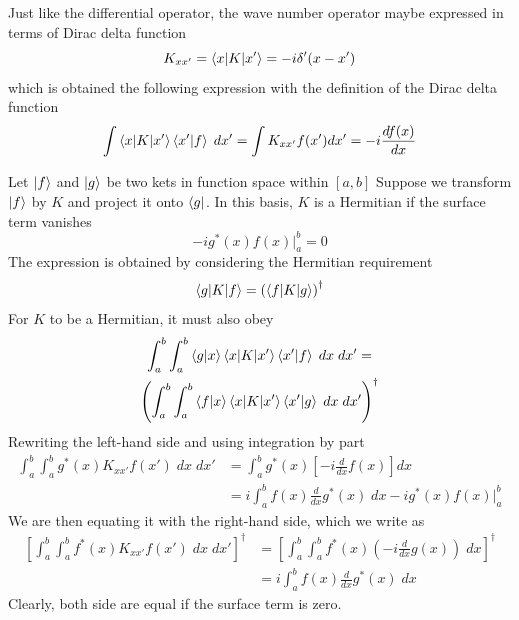 \documentclass[../../../main.tex]{subfiles}
\begin{document}
Just like the differential operator, the wave number operator maybe expressed in terms of Dirac delta function
\begin{equation*}
	K_{xx'}=\braket{x|K|x'}=-i\delta'(x-x')
\end{equation*}
which is obtained the following expression with the definition of the Dirac delta function
\begin{equation*}
	\int \braket{x|K|x'}\braket{x'|f}\;dx'=\int K_{xx'}f(x')dx'=-i\frac{df(x)}{dx}
\end{equation*}

Let $\ket{f}$ and $\ket{g}$ be two kets in function space within $[a,b]$
Suppose we transform $\ket{f}$ by $K$ and project it onto $\bra{g}$.
In this basis, $K$ is a Hermitian if the surface term vanishes
\begin{equation*}
	-ig ^*(x)f(x)\bigg|_{a}^b=0
\end{equation*}
The expression is obtained by considering the Hermitian requirement
\begin{equation*}
	\braket{g|K|f}=\left(\braket{f|K|g}\right)^\dagger
\end{equation*}
For $K$ to be a Hermitian, it must also obey
\begin{multline*}
	\int_{a }^{b }\int_{ a }^{b }\braket{g|x}\braket{x|K|x'}\braket{x'|f}\;dx\;dx'
	=\\
	\left(	\int_{a }^{b }\int_{ a }^{b }\braket{f|x}\braket{x|K|x'}\braket{x'|g}\;dx\;dx'\right)^\dagger
\end{multline*}
Rewriting the left-hand side and using integration by part
\begin{align*}
	\int_{a}^{b}\int_{a }^{b}g ^*(x)K_{xx'}f(x')\;dx\;dx' & =\int_{a}^b g ^*(x)\left[-i \frac{d }{dx}f(x)\right]dx                 \\
	                                                      & =i\int_{a }^{b }f(x) \frac{d }{dx}g ^*(x)\;dx-ig ^*(x)f(x)\bigg|_{a}^b
\end{align*}
We are then equating it with the right-hand side, which we write as
\begin{align*}
	\left[\int_{a }^{b}\int_{a }^{b}f ^*(x)K_{xx'}f(x')\;dx\;dx'\right]^\dagger & =
	\left[\int_{a }^{b }\int_{a}^{b}f ^*(x)\left(-i \frac{d }{dx}g(x)\right)\;dx\right]^\dagger                                \\
	                                                                            & =i\int_{a }^{b }f(x)\frac{d }{dx}g ^*(x)\;dx
\end{align*}
Clearly, both side are equal if the surface term is zero.
\end{document}
